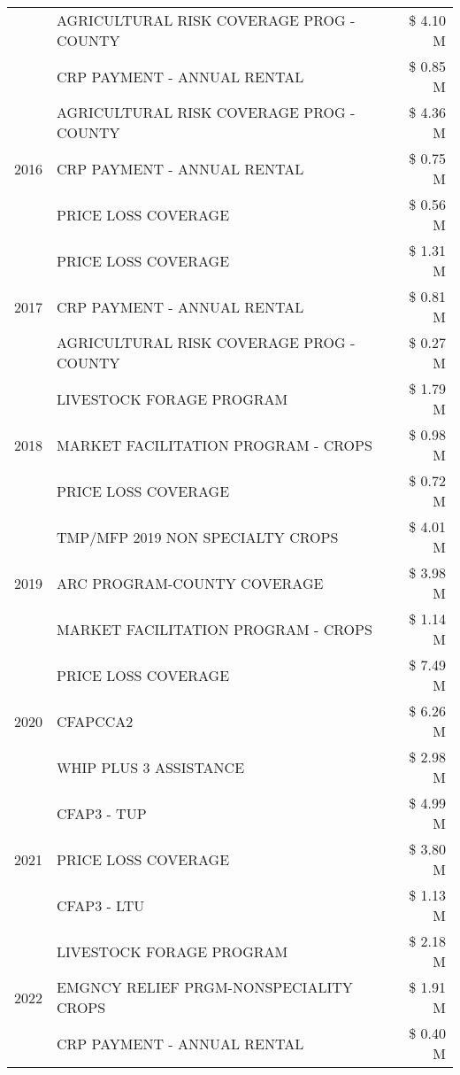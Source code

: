 \begin{tabular}{llr}
 & AGRICULTURAL RISK COVERAGE PROG - COUNTY & \$ 4.10 M \\
 & CRP PAYMENT - ANNUAL RENTAL & \$ 0.85 M \\
\cline{1-3}
\multirow[t]{3}{*}{2016} & AGRICULTURAL RISK COVERAGE PROG - COUNTY & \$ 4.36 M \\
 & CRP PAYMENT - ANNUAL RENTAL & \$ 0.75 M \\
 & PRICE LOSS COVERAGE & \$ 0.56 M \\
\cline{1-3}
\multirow[t]{3}{*}{2017} & PRICE LOSS COVERAGE & \$ 1.31 M \\
 & CRP PAYMENT - ANNUAL RENTAL & \$ 0.81 M \\
 & AGRICULTURAL RISK COVERAGE PROG - COUNTY & \$ 0.27 M \\
\cline{1-3}
\multirow[t]{3}{*}{2018} & LIVESTOCK FORAGE PROGRAM & \$ 1.79 M \\
 & MARKET FACILITATION PROGRAM - CROPS & \$ 0.98 M \\
 & PRICE LOSS COVERAGE & \$ 0.72 M \\
\cline{1-3}
\multirow[t]{3}{*}{2019} & TMP/MFP 2019 NON SPECIALTY CROPS & \$ 4.01 M \\
 & ARC PROGRAM-COUNTY COVERAGE & \$ 3.98 M \\
 & MARKET FACILITATION PROGRAM - CROPS & \$ 1.14 M \\
\cline{1-3}
\multirow[t]{3}{*}{2020} & PRICE LOSS COVERAGE & \$ 7.49 M \\
 & CFAPCCA2 & \$ 6.26 M \\
 & WHIP PLUS 3 ASSISTANCE & \$ 2.98 M \\
\cline{1-3}
\multirow[t]{3}{*}{2021} & CFAP3 - TUP & \$ 4.99 M \\
 & PRICE LOSS COVERAGE & \$ 3.80 M \\
 & CFAP3 - LTU & \$ 1.13 M \\
\cline{1-3}
\multirow[t]{3}{*}{2022} & LIVESTOCK FORAGE PROGRAM & \$ 2.18 M \\
 & EMGNCY RELIEF PRGM-NONSPECIALITY CROPS & \$ 1.91 M \\
 & CRP PAYMENT - ANNUAL RENTAL & \$ 0.40 M \\
\cline{1-3}
\bottomrule
\end{tabular}

